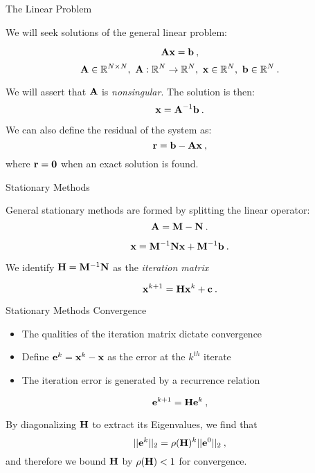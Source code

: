 \documentclass{beamer}
\begin{document}
\begin{frame}{The Linear Problem}

  We will seek solutions of the general linear problem:

  \[
  \mathbf{A} \mathbf{x} = \mathbf{b}\:,
  \]
  \[
  \mathbf{A} \in \mathbb{R}^{N \times N},\ \mathbf{A} : \mathbb{R}^{N}
  \rightarrow \mathbb{R}^{N},\ \mathbf{x} \in \mathbb{R}^N,\ \mathbf{b} \in
  \mathbb{R}^N\:.
  \]

  We will assert that $\mathbf{A}$ is \textit{nonsingular}. The solution
  is then:
  \[
  \mathbf{x} = \mathbf{A}^{-1}\mathbf{b}\:.
  \]

  We can also define the residual of the system as:
  \[
  \mathbf{r} = \mathbf{b} - \mathbf{A}\mathbf{x}\:,
  \]
  where $\mathbf{r}=\mathbf{0}$ when an exact solution is found.

\end{frame}

\begin{frame}{Stationary Methods}

  General stationary methods are formed by splitting the linear
  operator:
  \[
  \mathbf{A} = \mathbf{M} - \mathbf{N}\:.
  \]


  \[
  \mathbf{x} = \mathbf{M}^{-1}\mathbf{N}\mathbf{x} + \mathbf{M}^{-1}\mathbf{b}\:.
  \]

  We identify $\mathbf{H} =\mathbf{M}^{-1}\mathbf{N}$ as the \textit{iteration
    matrix}

  \[
  \mathbf{x}^{k+1} = \mathbf{H}\mathbf{x}^{k} + \mathbf{c}\:.
  \]

\end{frame}

\begin{frame}{Stationary Methods Convergence}

  \begin{itemize}
  \item The qualities of the iteration matrix dictate convergence 
  \item Define $\mathbf{e}^k = \mathbf{x}^k-\mathbf{x}$ as the error at the
    $k^{th}$ iterate
  \item The iteration error is generated by a recurrence relation
  \end{itemize}

  \[
  \mathbf{e}^{k+1} = \mathbf{H} \mathbf{e}^k\:,
  \]
  
  By diagonalizing $\mathbf{H}$ to extract its Eigenvalues, we find that 
  \[
  ||\mathbf{e}^{k}||_2 = \rho(\mathbf{H})^k ||\mathbf{e}^0||_2\:,
  \]
  and therefore we bound $\mathbf{H}$ by $\rho(\mathbf{H}) < 1$ for convergence.

\end{frame}
\end{document}
